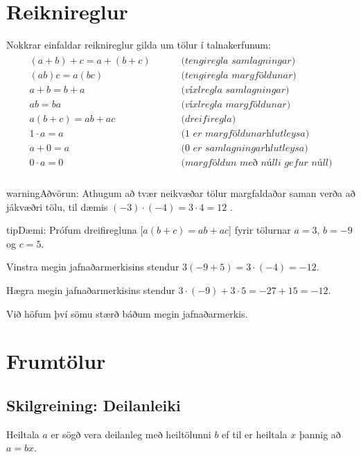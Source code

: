 \documentclass[a4paper,10pt,icelandic]{sphinxmanual}
\begin{document}
\section{Reiknireglur}
\label{\detokenize{Kafli01:reiknireglur}}
Nokkrar einfaldar reiknireglur gilda um tölur í talnakerfunum:
\begin{equation*}
\begin{split}\begin{aligned}
(a+b)+c=a+(b+c) &  \qquad \textit{ (tengiregla samlagningar)}\\
(ab)c=a(bc) & \qquad \textit{ (tengiregla margföldunar)}\\
a+b=b+a & \qquad \textit{ (víxlregla samlagningar)}\\
ab=ba & \qquad \textit{ (víxlregla margföldunar)}\\
a(b+c)=ab+ac & \qquad \textit{ (dreifiregla)}\\
1 \cdot a=a & \qquad \textit{ (1 er margföldunarhlutleysa)}\\
a+0=a & \qquad \textit{ (0 er samlagningarhlutleysa)}\\
0 \cdot a=0  & \qquad \textit{ (margföldun með núlli gefur núll)}\\
\end{aligned}\end{split}
\end{equation*}
\begin{sphinxadmonition}{warning}{Aðvörun:}
Athugum að tvær neikvæðar tölur margfaldaðar saman verða að jákvæðri tölu, til dæmis \((-3)\cdot (-4) = 3\cdot 4 =12\) .
\end{sphinxadmonition}

\begin{sphinxadmonition}{tip}{Dæmi:}
Prófum dreifiregluna {[}\(a(b+c)=ab+ac\){]} fyrir tölurnar \(a=3\), \(b=-9\) og \(c=5\).

Vinstra megin jafnaðarmerkisins stendur \(3(-9+5)=3\cdot(-4)=-12\).

Hægra megin jafnaðarmerkisins stendur \(3\cdot(-9)+3\cdot 5=-27+15=-12\).

Við höfum því sömu stærð báðum megin jafnaðarmerkis.
\end{sphinxadmonition}


\section{Frumtölur}
\label{\detokenize{Kafli01:frumtolur}}

\subsection{Skilgreining: Deilanleiki}
\label{\detokenize{Kafli01:skilgreining-deilanleiki}}
Heiltala \(a\) er sögð vera deilanleg með heiltölunni \(b\) ef til er heiltala \(x\) þannig að \(a=bx\).
\end{document}
